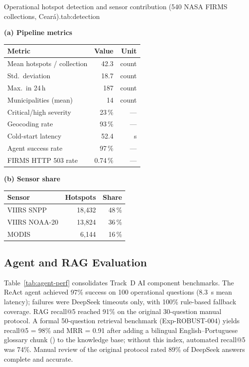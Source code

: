 \documentclass[preprint,12pt,times,numbers]{elsarticle}
\providecommand{\paneltitle}[1]{\par\noindent\textbf{#1}\par\smallskip}
\begin{document}
\begin{resulttable}{Operational hotspot detection and sensor contribution (540 NASA FIRMS collections, Ceará).}{tab:detection}
\begin{minipage}[t]{0.48\linewidth}
\paneltitle{(a) Pipeline metrics}
\begin{tabular}{@{}lrr@{}}
\toprule
\textbf{Metric} & \textbf{Value} & \textbf{Unit} \\
\midrule
Mean hotspots / collection & 42.3 & count \\
Std.\ deviation & 18.7 & count \\
Max.\ in 24\,h & 187 & count \\
Municipalities (mean) & 14 & count \\
Critical/high severity & 23\,\% & --- \\
Geocoding rate & 93\,\% & --- \\
Cold-start latency & 52.4 & s \\
Agent success rate & 97\,\% & --- \\
FIRMS HTTP 503 rate & 0.74\,\% & --- \\
\bottomrule
\end{tabular}
\end{minipage}\hfill
\begin{minipage}[t]{0.48\linewidth}
\paneltitle{(b) Sensor share}
\begin{tabular}{@{}lrr@{}}
\toprule
\textbf{Sensor} & \textbf{Hotspots} & \textbf{Share} \\
\midrule
VIIRS SNPP & 18{,}432 & 48\,\% \\
VIIRS NOAA-20 & 13{,}824 & 36\,\% \\
MODIS & 6{,}144 & 16\,\% \\
\bottomrule
\end{tabular}
\end{minipage}
\end{resulttable}

\subsection{Agent and RAG Evaluation}
\label{sec:agent-rag}

Table~\ref{tab:agent-perf} consolidates Track~D AI component benchmarks. The ReAct agent achieved 97\% success on 100 operational questions (8.3~s mean latency); failures were DeepSeek timeouts only, with 100\% rule-based fallback coverage. RAG recall@5 reached 91\% on the original 30-question manual protocol. A formal 50-question retrieval benchmark (Exp-ROBUST-004) yields recall@5 = 98\% and MRR = 0.91 after adding a bilingual English--Portuguese glossary chunk () to the knowledge base; without this index, automated recall@5 was 74\%. Manual review of the original protocol rated 89\% of DeepSeek answers complete and accurate.
\end{document}
